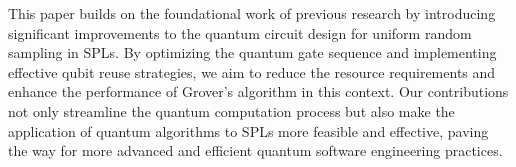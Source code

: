 This paper builds on the foundational work of previous research \cite{ammermann2023quantumcomputingimproveuniform} by introducing significant improvements to the quantum circuit design for uniform random sampling in SPLs.
By optimizing the quantum gate sequence and implementing effective qubit reuse strategies, we aim to reduce the resource requirements and enhance the performance of Grover's algorithm in this context.
Our contributions not only streamline the quantum computation process but also make the application of quantum algorithms to SPLs more feasible and effective, paving the way for more advanced and efficient quantum software engineering practices.